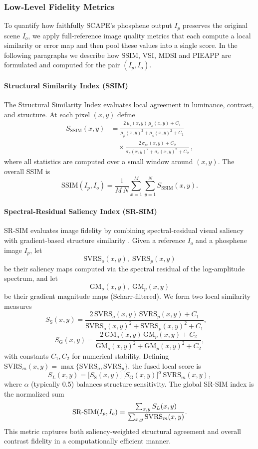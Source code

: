 \subsubsection{Low‐Level Fidelity Metrics}
To quantify how faithfully SCAPE’s phosphene output \(I_p\) preserves the original scene \(I_o\), we apply full‐reference image quality metrics that each compute a local similarity or error map and then pool these values into a single score.  In the following paragraphs we describe how SSIM, VSI, MDSI and PIEAPP are formulated and computed for the pair \((I_p,I_o)\).  


\paragraph{Structural Similarity Index (SSIM)}  
The Structural Similarity Index \cite{Wang2004} evaluates local agreement in luminance, contrast, and structure.  At each pixel \((x,y)\) define
\begin{align*}
S_{\mathrm{SSIM}}(x,y)
&= \frac{2\,\mu_p(x,y)\,\mu_o(x,y) + C_1}
       {\mu_p(x,y)^2 + \mu_o(x,y)^2 + C_1}\\
&\quad\times
    \frac{2\,\sigma_{po}(x,y) + C_2}
         {\sigma_p(x,y)^2 + \sigma_o(x,y)^2 + C_2}\,,
\end{align*}
where all statistics are computed over a small window around \((x,y)\).  The overall SSIM is
\[
\mathrm{SSIM}(I_p,I_o)
= \frac{1}{M\,N}
  \sum_{x=1}^{M}\sum_{y=1}^{N}
  S_{\mathrm{SSIM}}(x,y).
\]


\paragraph{Spectral‐Residual Saliency Index (SR-SIM)}  
SR-SIM evaluates image fidelity by combining spectral‐residual visual saliency with gradient‐based structure similarity \cite{Zhang2012}.  Given a reference \(I_o\) and a phosphene image \(I_p\), let  
\[
\mathrm{SVRS}_o(x,y),\;\mathrm{SVRS}_p(x,y)
\]
be their saliency maps computed via the spectral residual of the log‐amplitude spectrum, and let  
\[
\mathrm{GM}_o(x,y),\;\mathrm{GM}_p(x,y)
\]
be their gradient magnitude maps (Scharr‐filtered).  We form two local similarity measures  
\[
S_{\mathrm{S}}(x,y)
=\frac{2\,\mathrm{SVRS}_o(x,y)\,\mathrm{SVRS}_p(x,y)+C_1}
      {\mathrm{SVRS}_o(x,y)^2+\mathrm{SVRS}_p(x,y)^2+C_1},
\quad
\]
\[
S_{\mathrm{G}}(x,y)
=\frac{2\,\mathrm{GM}_o(x,y)\,\mathrm{GM}_p(x,y)+C_2}
      {\mathrm{GM}_o(x,y)^2+\mathrm{GM}_p(x,y)^2+C_2},
\]
with constants \(C_1,C_2\) for numerical stability.  Defining  
\(\mathrm{SVRS}_m(x,y)=\max\{\mathrm{SVRS}_o,\mathrm{SVRS}_p\}\), the fused local score is  
\[
S_L(x,y)
=\bigl[S_{\mathrm{S}}(x,y)\bigr]\,
\bigl[S_{\mathrm{G}}(x,y)\bigr]^\alpha\,
\mathrm{SVRS}_m(x,y),
\]
where \(\alpha\) (typically 0.5) balances structure sensitivity.  The global SR-SIM index is the normalized sum  
\[
\mathrm{SR{\text -}SIM}(I_p,I_o)
=\frac{\sum_{x,y}S_L(x,y)}
      {\sum_{x,y}\mathrm{SVRS}_m(x,y)}.
\]
This metric captures both saliency‐weighted structural agreement and overall contrast fidelity in a computationally efficient manner.



